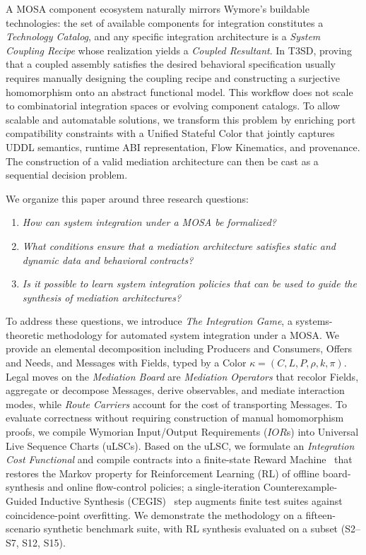 A MOSA component ecosystem naturally mirrors Wymore's buildable technologies: the set of available components for integration constitutes a \emph{Technology Catalog}, and any specific integration architecture is a \emph{System Coupling Recipe} whose realization yields a \emph{Coupled Resultant}.  In T3SD, proving that a coupled assembly satisfies the desired behavioral specification usually requires manually designing the coupling recipe and constructing a surjective homomorphism onto an abstract functional model.  This workflow does not scale to combinatorial integration spaces or evolving component catalogs.  To allow scalable and automatable solutions, we transform this problem by enriching port compatibility constraints with a Unified Stateful Color that jointly captures UDDL semantics, runtime ABI representation, Flow Kinematics, and provenance.  The construction of a valid mediation architecture can then be cast as a sequential decision problem.

We organize this paper around three research questions:
\begin{enumerate}[label=\textbf{RQ\arabic*:}, leftmargin=2.8em, topsep=3pt, itemsep=2pt]
    \item \emph{How can system integration under a MOSA be formalized?}
    \item \emph{What conditions ensure that a mediation architecture satisfies static and dynamic data and behavioral contracts?}
    \item \emph{Is it possible to learn system integration policies that can be used to guide the synthesis of mediation architectures?}
\end{enumerate}

To address these questions, we introduce \emph{The Integration Game}, a systems-theoretic methodology for automated system integration under a MOSA.  We provide an elemental decomposition including Producers and Consumers, Offers and Needs, and Messages with Fields, typed by a Color $\kappa = (C, L, P, \rho, k, \pi)$.  Legal moves on the \emph{Mediation Board} are \emph{Mediation Operators} that recolor Fields, aggregate or decompose Messages, derive observables, and mediate interaction modes, while \emph{Route Carriers} account for the cost of transporting Messages.  To evaluate correctness without requiring construction of manual homomorphism proofs, we compile Wymorian Input/Output Requirements ($IOR$s) into Universal Live Sequence Charts (uLSCs).  Based on the uLSC, we formulate an \emph{Integration Cost Functional} and compile contracts into a finite-state Reward Machine~\cite{ToroIcarte2022} that restores the Markov property for Reinforcement Learning (RL) of offline board-synthesis and online flow-control policies; a single-iteration Counterexample-Guided Inductive Synthesis (CEGIS)~\cite{SolarLezama2008Sketch, AlurEtAl2013SyGuS} step augments finite test suites against coincidence-point overfitting.  We demonstrate the methodology on a fifteen-scenario synthetic benchmark suite, with RL synthesis evaluated on a subset (S2--S7, S12, S15).

